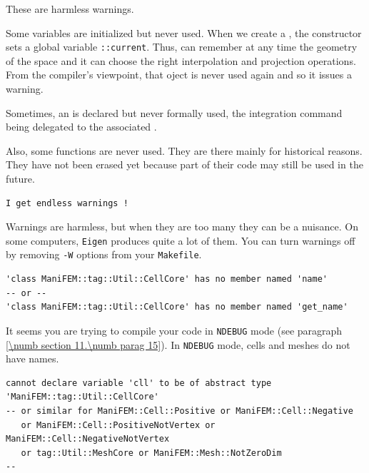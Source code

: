 These are harmless warnings.

Some variables are initialized but never used.
When we create a {\small\tt{}}, the constructor sets a global variable
{\small\tt{}::current}.
Thus, {\maniFEM} can remember at any time the geometry of the space and it can choose the right
interpolation and projection operations.
From the compiler's viewpoint, that {\small\tt{}} oject is never used again and
so it issues a warning.

Sometimes, an {\small\tt{}} is declared but never formally used,
the integration command being delegated to the associated {\small\tt{}}.

Also, some functions are never used.
They are there mainly for historical reasons.
They have not been erased yet because part of their code may still be used in the future.

\begin{Verbatim}[commandchars=\\\{\},formatcom=\normalfont\rmfamily,baselinestretch=0.94]
I get endless warnings !
\end{Verbatim}

Warnings are harmless, but when they are too many they can be a nuisance.
On some computers, {\small\tt Eigen} produces quite a lot of them.
You can turn warnings off by removing {\small\tt -W} options from your {\small\tt Makefile}.

\begin{Verbatim}[commandchars=\\\{\},formatcom=\small\tt,baselinestretch=0.94]
'class ManiFEM::tag::Util::CellCore' has no member named 'name'
-- or --
'class ManiFEM::tag::Util::CellCore' has no member named 'get_name'
\end{Verbatim}

It seems you are trying to compile your code in {\small\tt NDEBUG} mode
(see paragraph \ref{\numb section 11.\numb parag 15}).
In {\small\tt NDEBUG} mode, cells and meshes do not have names.

\begin{Verbatim}[commandchars=\\\{\},formatcom=\small\tt,baselinestretch=0.94]
cannot declare variable 'cll' to be of abstract type 'ManiFEM::tag::Util::CellCore'
-- or similar for ManiFEM::Cell::Positive or ManiFEM::Cell::Negative
   or ManiFEM::Cell::PositiveNotVertex or ManiFEM::Cell::NegativeNotVertex
   or tag::Util::MeshCore or ManiFEM::Mesh::NotZeroDim                      --
\end{Verbatim}

